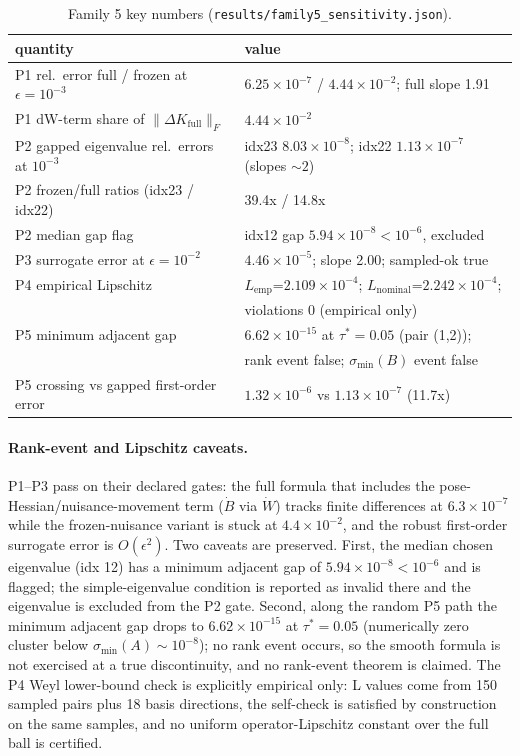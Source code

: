 \documentclass[12pt]{article}
\begin{document}
\begin{table}[ht]
\centering
\small
\caption{Family 5 key numbers (\texttt{results/family5\_sensitivity.json}).}
\label{tab:f5}
\begin{tabular}{p{} p{}}
\toprule
quantity & value \\
\midrule
P1 rel.\ error full / frozen at $\epsilon=10^{-3}$ &
$6.25\times10^{-7}$ / $4.44\times10^{-2}$; full slope 1.91 \\
P1 dW-term share of $\|\Delta K_{\mathrm{full}}\|_F$ & $4.44\times10^{-2}$ \\
P2 gapped eigenvalue rel.\ errors at $10^{-3}$ &
idx23 $8.03\times10^{-8}$; idx22 $1.13\times10^{-7}$ (slopes $\sim2$) \\
P2 frozen/full ratios (idx23 / idx22) & 39.4x / 14.8x \\
P2 median gap flag & idx12 gap $5.94\times10^{-8}<10^{-6}$, excluded \\
P3 surrogate error at $\epsilon=10^{-2}$ & $4.46\times10^{-5}$; slope 2.00; sampled-ok true \\
P4 empirical Lipschitz &
$L_{\mathrm{emp}}$=$2.109\times10^{-4}$; $L_{\mathrm{nominal}}$=$2.242\times10^{-4}$; \\
 & violations 0 (empirical only) \\
P5 minimum adjacent gap & $6.62\times10^{-15}$ at $\tau^*=0.05$ (pair (1,2)); \\
 & rank event false; $\sigma_{\min}(B)$ event false \\
P5 crossing vs gapped first-order error &
$1.32\times10^{-6}$ vs $1.13\times10^{-7}$ (11.7x) \\
\bottomrule
\end{tabular}
\end{table}

\paragraph{Rank-event and Lipschitz caveats.}
P1--P3 pass on their declared gates: the full formula that includes the
pose-Hessian/nuisance-movement term ($\dot B$ via $\dot W$) tracks finite
differences at $6.3\times10^{-7}$ while the frozen-nuisance variant is stuck at
$4.4\times10^{-2}$, and the robust first-order surrogate error is
$O(\epsilon^2)$. Two caveats are preserved. First, the median chosen
eigenvalue (idx 12) has a minimum adjacent gap of
$5.94\times10^{-8}<10^{-6}$ and is flagged; the simple-eigenvalue condition is
reported as invalid there and the eigenvalue is excluded from the P2 gate.
Second, along the random P5 path the minimum adjacent gap drops to
$6.62\times10^{-15}$ at $\tau^*=0.05$ (numerically zero cluster below
$\sigma_{\min}(A)\sim10^{-8}$); no rank event occurs, so the smooth formula is
not exercised at a true discontinuity, and no rank-event theorem is claimed.
The P4 Weyl lower-bound check is explicitly empirical only: L values come from
150 sampled pairs plus 18 basis directions, the self-check is satisfied by
construction on the same samples, and no uniform operator-Lipschitz constant
over the full ball is certified.
\end{document}
